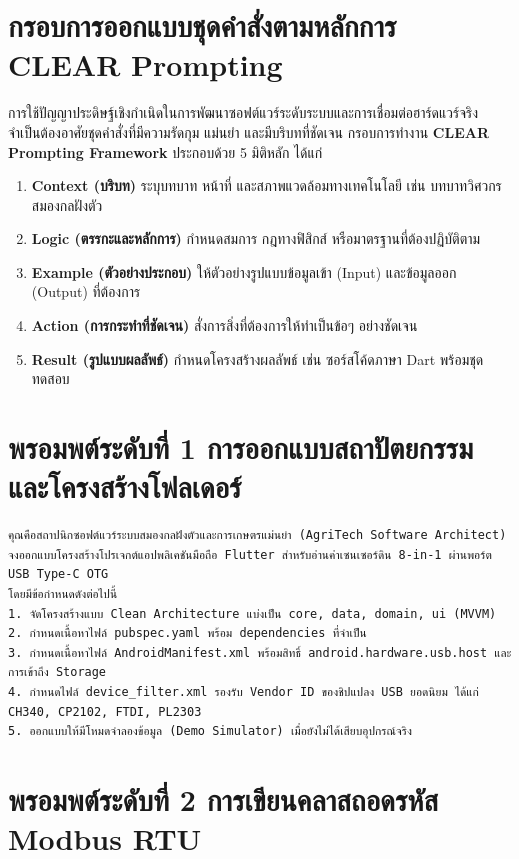 \section{กรอบการออกแบบชุดคำสั่งตามหลักการ CLEAR Prompting}

การใช้ปัญญาประดิษฐ์เชิงกำเนิดในการพัฒนาซอฟต์แวร์ระดับระบบและการเชื่อมต่อฮาร์ดแวร์จริง จำเป็นต้องอาศัยชุดคำสั่งที่มีความรัดกุม แม่นยำ และมีบริบทที่ชัดเจน กรอบการทำงาน \textbf{CLEAR Prompting Framework} ประกอบด้วย 5 มิติหลัก ได้แก่
\begin{enumerate}
    \item \textbf{Context (บริบท)} ระบุบทบาท หน้าที่ และสภาพแวดล้อมทางเทคโนโลยี เช่น บทบาทวิศวกรสมองกลฝังตัว
    \item \textbf{Logic (ตรรกะและหลักการ)} กำหนดสมการ กฎทางฟิสิกส์ หรือมาตรฐานที่ต้องปฏิบัติตาม
    \item \textbf{Example (ตัวอย่างประกอบ)} ให้ตัวอย่างรูปแบบข้อมูลเข้า (Input) และข้อมูลออก (Output) ที่ต้องการ
    \item \textbf{Action (การกระทำที่ชัดเจน)} สั่งการสิ่งที่ต้องการให้ทำเป็นข้อๆ อย่างชัดเจน
    \item \textbf{Result (รูปแบบผลลัพธ์)} กำหนดโครงสร้างผลลัพธ์ เช่น ซอร์สโค้ดภาษา Dart พร้อมชุดทดสอบ
\end{enumerate}

\section{พรอมพต์ระดับที่ 1 การออกแบบสถาปัตยกรรมและโครงสร้างโฟลเดอร์}

\begin{promptbox}
\begin{lstlisting}
คุณคือสถาปนิกซอฟต์แวร์ระบบสมองกลฝังตัวและการเกษตรแม่นยำ (AgriTech Software Architect)
จงออกแบบโครงสร้างโปรเจกต์แอปพลิเคชันมือถือ Flutter สำหรับอ่านค่าเซนเซอร์ดิน 8-in-1 ผ่านพอร์ต USB Type-C OTG
โดยมีข้อกำหนดดังต่อไปนี้
1. จัดโครงสร้างแบบ Clean Architecture แบ่งเป็น core, data, domain, ui (MVVM)
2. กำหนดเนื้อหาไฟล์ pubspec.yaml พร้อม dependencies ที่จำเป็น
3. กำหนดเนื้อหาไฟล์ AndroidManifest.xml พร้อมสิทธิ์ android.hardware.usb.host และการเข้าถึง Storage
4. กำหนดไฟล์ device_filter.xml รองรับ Vendor ID ของชิปแปลง USB ยอดนิยม ได้แก่ CH340, CP2102, FTDI, PL2303
5. ออกแบบให้มีโหมดจำลองข้อมูล (Demo Simulator) เมื่อยังไม่ได้เสียบอุปกรณ์จริง
\end{lstlisting}
\end{promptbox}

\section{พรอมพต์ระดับที่ 2 การเขียนคลาสถอดรหัส Modbus RTU}

